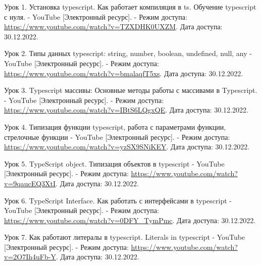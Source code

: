 \documentclass[12pt, a4paper, simple]{eskdtext}
\begin{document}
    \renewcommand{\addcontentsline}[3]{}%
    \renewcommand{\section}[2]{}%

    \begin{thebibliography}{}

    Урок 1. Установка typescript. Как работает компиляция в ts. Обучение typescript с нуля. - YouTube
    [Электронный ресурс]. -
    Режим доступа:
    \url{https://www.youtube.com/watch?v=TZXDHK0UXZM}.
    Дата доступа: 30.12.2022.

    Урок 2. Типы данных typescript: string, number, boolean, undefined, null, any - YouTube
    [Электронный ресурс]. -
    Режим доступа:
    \url{https://www.youtube.com/watch?v=bmalaqfT5xs}.
    Дата доступа: 30.12.2022.

    Урок 3. Typescript массивы: Основные методы работы с массивами в Typescript. - YouTube
    [Электронный ресурс]. -
    Режим доступа:
    \url{https://www.youtube.com/watch?v=IBtS6LQgxQE}.
    Дата доступа: 30.12.2022.

    Урок 4. Типизация функции typescript, работа с параметрами функции, стрелочные функции - YouTube
    [Электронный ресурс]. -
    Режим доступа:
    \url{https://www.youtube.com/watch?v=yzSX9SNiKEY}.
    Дата доступа: 30.12.2022.

    Урок 5. TypeScript object. Типизация объектов в typescript - YouTube
    [Электронный ресурс]. -
    Режим доступа:
    \url{https://www.youtube.com/watch?v=9qaucEQ3XtI}.
    Дата доступа: 30.12.2022.

    Урок 6. TypeScript Interface. Как работать с интерфейсами в typescript - YouTube
    [Электронный ресурс]. -
    Режим доступа:
    \url{https://www.youtube.com/watch?v=0DFY_TymPmc}.
    Дата доступа: 30.12.2022.

    Урок 7. Как работают литералы в typescript. Literals in typescript - YouTube
    [Электронный ресурс]. -
    Режим доступа:
    \url{https://www.youtube.com/watch?v=2O7Ih4uFb-Y}.
    Дата доступа: 30.12.2022.


\end{thebibliography}
\end{document}
